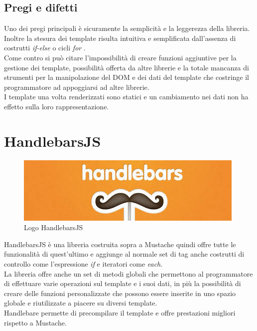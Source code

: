 \subsection{Pregi e difetti}
Uno dei pregi principali è sicuramente la semplicità e la leggerezza della libreria.\\
Inoltre la stesura dei template risulta intuitiva e semplificata dall'assenza di costrutti \textit{if-else} o cicli \textit{for} .\\
Come contro si può citare l'impossibilità di creare funzioni aggiuntive per la gestione dei template, possibilità offerta da altre librerie e la totale mancanza di strumenti per la manipolazione del DOM e dei dati del template che costringe il programmatore ad appoggiarsi ad altre librerie.\\
I template una volta renderizzati sono statici e un cambiamento nei dati non ha effetto sulla loro rappresentazione.

\FloatBarrier
\section{HandlebarsJS}

\begin{figure}[htp]
	\centering
	\includegraphics[width=\textwidth/2]{../immagini/handlebars_logo}
	\caption{Logo  HandlebarsJS}
\end{figure}

HandlebarsJS è una libreria costruita sopra a Mustache quindi offre tutte le funzionalità di quest'ultimo e aggiunge al normale set di tag anche costrutti di controllo come l'espressione \textit{if} e iteratori come \textit{each}.\\
La libreria offre anche un set di metodi globali che permettono al programmatore di effettuare varie operazioni sul template e i suoi dati, in più la possibilità di creare delle funzioni personalizzate che possono essere inserite in uno spazio globale e riutilizzate a piacere su diversi template.\\
Handlebare permette di precompilare il template e offre prestazioni migliori rispetto a Mustache.
